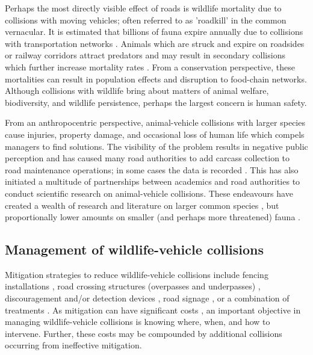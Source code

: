 Perhaps the most directly visible effect of roads is wildlife mortality due to collisions with moving vehicles; often referred to as 'roadkill' in the common vernacular. It is estimated that billions of fauna expire annually due to collisions with transportation networks \citep{seil06}. Animals which are struck and expire on roadsides or railway corridors attract predators and may result in secondary collisions which further increase mortality rates \citep{spel98}. From a conservation perspective, these mortalities can result in population effects and disruption to food-chain networks.  Although collisions with wildlife bring about matters of animal welfare, biodiversity, and wildlife persistence, perhaps the largest concern is human safety. 

From an anthropocentric perspective, animal-vehicle collisions with larger species cause injuries, property damage, and occasional loss of human life which compels managers to find solutions. The visibility of the problem results in negative public perception and has caused many road authorities to add carcass collection to road maintenance operations; in some cases the data is recorded \citep{huij07a}. This has also initiated a multitude of partnerships between academics and road authorities to conduct scientific research on animal-vehicle collisions.  These endeavours have created a wealth of research and literature on larger common species \citep{biss08b,clev01,romi96,sudh09}, but proportionally lower amounts on smaller (and perhaps more threatened) fauna \citep{clev03}.

\subsection{Management of wildlife-vehicle collisions}

Mitigation strategies to reduce wildlife-vehicle collisions include fencing installations \citep{clev01,jaeg04}, road crossing structures (overpasses and underpasses) \citep{bond08}, discouragement and/or detection devices \citep{huij03,huij06}, road signage \citep{bond13}, or a combination of treatments \citep{dani98,pola14,romi96}. As mitigation can have significant costs \citep{huij09}, an important objective in managing wildlife-vehicle collisions is knowing where, when, and how to intervene. Further, these costs may be compounded by additional collisions occurring from ineffective mitigation.

